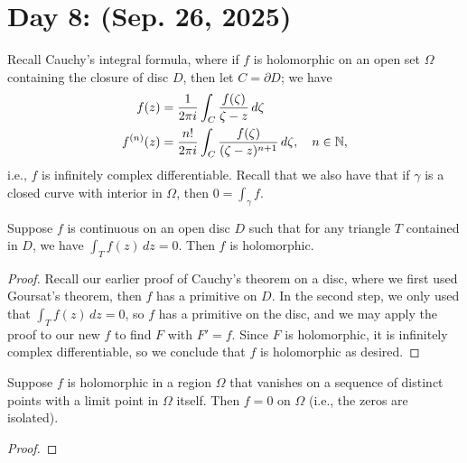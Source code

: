 \section{Day 8: (Sep. 26, 2025)}
Recall Cauchy's integral formula, where if $f$ is holomorphic on an open set $\Omega$ containing the closure of disc $D$, then let $C = \partial D$; we have
\begin{align*}
    f(z) &= \frac{1}{2\pi i} \int_C \frac{f(\zeta)}{\zeta - z} \, d\zeta \\
    f^{(n)}(z) &= \frac{n!}{2 \pi i} \int_C \frac{f(\zeta)}{(\zeta - z)^{n+1}} \, d\zeta, \quad n \in \mathbb N,
\end{align*}
i.e., $f$ is infinitely complex differentiable. Recall that we also have that if $\gamma$ is a closed curve with interior in $\Omega$, then $0 = \int_\gamma f$.
\begin{theorem}
    Suppose $f$ is continuous on an open disc $D$ such that for any triangle $T$ contained in $D$, we have $\int_T f(z) \, dz = 0$. Then $f$ is holomorphic.
\end{theorem}
\begin{proof}
    Recall our earlier proof of Cauchy's theorem on a disc, where we first used Goursat's theorem, then $f$ has a primitive on $D$. In the second step, we only used that $\int_T f(z) \, dz = 0$, so $f$ has a primitive on the disc, and we may apply the proof to our new $f$ to find $F$ with $F' = f$. Since $F$ is holomorphic, it is infinitely complex differentiable, so we conclude that $f$ is holomorphic as desired.
\end{proof}
\begin{theorem}
    Suppose $f$ is holomorphic in a region $\Omega$ that vanishes on a sequence of distinct points with a limit point in $\Omega$ itself. Then $f = 0$ on $\Omega$ (i.e., the zeros are isolated).
\end{theorem}
\begin{proof}
    
\end{proof}